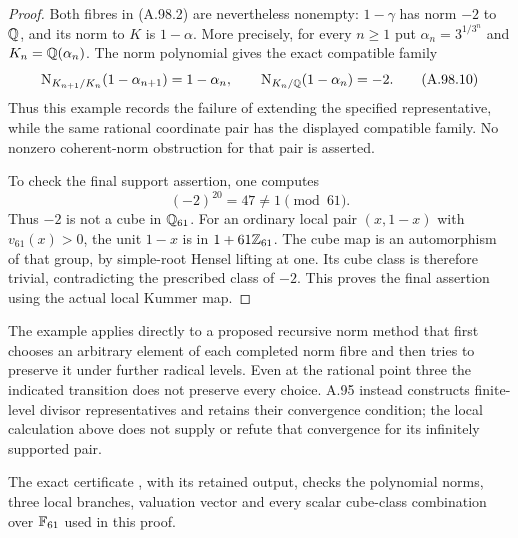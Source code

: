 \begin{proof}
Both fibres in (A.98.2) are nevertheless nonempty:
$1-\gamma$ has norm $-2$ to $\mathbb Q$, and its norm to $K$
is $1-\alpha$.  More precisely, for every $n\ge1$ put
$\alpha_n=3^{1/3^n}$ and $K_n=\mathbb Q(\alpha_n)$.
The norm polynomial gives the exact compatible family
\[
 \mathrm N_{K_{n+1}/K_n}(1-\alpha_{n+1})=1-\alpha_n,
          \qquad\mathrm N_{K_n/\mathbb Q}(1-\alpha_n)=-2.
 \tag{A.98.10}
\]
Thus this example records the failure of extending the specified
representative, while the same rational coordinate pair has the
displayed compatible family.  No nonzero coherent-norm obstruction
for that pair is asserted.

To check the final support assertion, one computes
\[
                         (-2)^{20}=47\ne1\pmod {61}.
 \tag{A.98.11}
\]
Thus $-2$ is not a cube in $\mathbb Q_{61}$.
For an ordinary local pair $(x,1-x)$ with $v_{61}(x)>0$,
the unit $1-x$ is in $1+61\mathbb Z_{61}$.
The cube map is an automorphism of that group, by simple-root
Hensel lifting at one.  Its cube class is therefore trivial,
contradicting the prescribed class of $-2$.
This proves the final assertion using the actual local Kummer map.
\end{proof}

The example applies directly to a proposed recursive norm method
that first chooses an arbitrary element of each completed norm
fibre and then tries to preserve it under further radical levels.
Even at the rational point three the indicated transition does
not preserve every choice.  A.95 instead constructs finite-level
divisor representatives and retains their convergence condition;
the local calculation above does not supply or refute that
convergence for its infinitely supported pair.

The exact certificate
, with its retained
output, checks the polynomial norms, three local branches,
valuation vector and every scalar cube-class combination over
$\mathbb F_{61}$ used in this proof.
